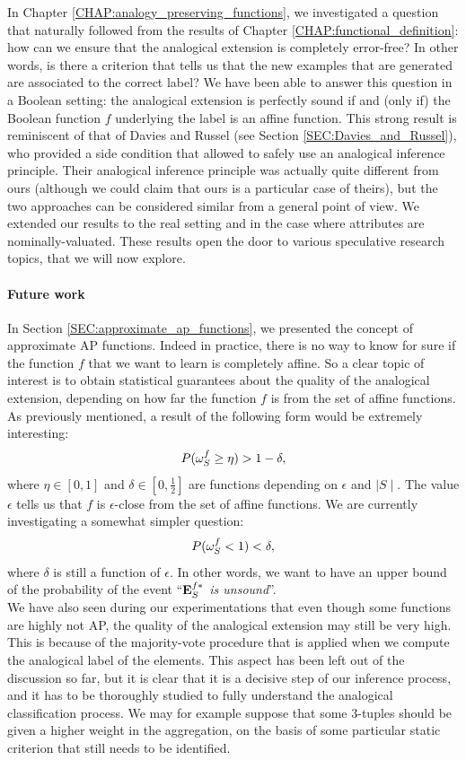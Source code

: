In Chapter \ref{CHAP:analogy_preserving_functions}, we investigated a question
that naturally followed from the results of Chapter
\ref{CHAP:functional_definition}: how can we ensure that the analogical
extension is completely error-free? In other words, is there a criterion that
tells us that the new examples that are generated are associated to the correct
label? We have been able to answer this question in a Boolean setting: the
analogical extension is perfectly sound if and (only if) the Boolean function
$f$ underlying the label is an affine function. This strong result
\cite{CouHugPraRicIJCAI17} is reminiscent of that of Davies and Russel (see
Section \ref{SEC:Davies_and_Russel}), who provided a side condition that
allowed to safely use an analogical inference principle. Their analogical
inference principle was actually quite different from ours (although we could claim
that ours is a particular case of theirs), but the two approaches can be
considered similar from a general point of view. We extended our results to the
real setting and in the case where attributes are nominally-valuated. These
results open the door to various speculative research topics, that we will now
explore.

\paragraph{Future work\\}

In Section \ref{SEC:approximate_ap_functions}, we presented the concept of
approximate AP functions. Indeed in practice, there is no way
to know for sure if the function $f$ that we want to learn is completely
affine. So a clear topic of interest is to obtain statistical guarantees about
the quality of the analogical extension, depending on how far the function $f$
is from the set of affine functions. As previously mentioned, a result of the
following form would be extremely interesting:
$$P(\omega_{S}^{f} \geq \eta) > 1 - \delta,$$
where $\eta \in [0, 1]$ and $\delta \in [0, \frac{1}{2}]$ are functions
depending on $\epsilon$ and $\mid S \mid$. The value $\epsilon$ tells us that
$f$ is $\epsilon$-close from the set of affine functions.  We are currently
investigating a somewhat simpler question:
$$P(\omega_{S}^{f} < 1) < \delta,$$
where $\delta$ is still a function of $\epsilon$. In other words, we want to
have an upper bound of the probability of the event ``\textit{$\mathbf{E}_{S}^{f*}$ is
unsound}''.\\

We have also seen during our experimentations that even though some functions are
highly not AP, the quality of the analogical extension may still be very high.
This is because of the majority-vote procedure that is applied when we compute
the analogical label of the elements. This aspect has been left out of the
discussion so far, but it is clear that it is a decisive step of our inference
process, and it has to be thoroughly studied to fully understand the analogical
classification process. We may for example suppose that some $3$-tuples should
be given a higher weight in the aggregation, on the basis of some particular
static criterion that still needs to be identified.\\

